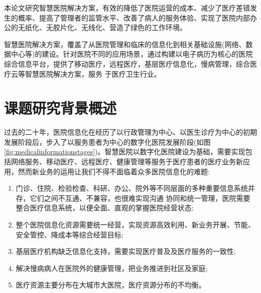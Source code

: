 \documentclass[doctor,secret]{thuthesis}
\begin{document}
本论文研究智慧医院解决方案，有效的降低了医院运营的成本、减少了医疗差错发生的概率、提高了管理者的监管水平、改善了病人的服务体验、实现了医院内部办公的无纸化、无胶片化、无线化、营造了绿色的工作环境。

智慧医院解决方案，覆盖了从医院管理和临床的信息化到相关基础设施(网络、数据中心等)的建设。针对医院不同的应用场景，通过构建以电子病历为核心的医院综合信息平台，提供了移动医疗，远程医疗，基层医疗信息化，慢病管理，综合医疗云等智慧医院解决方案，服务 于医疗卫生行业。

\section{课题研究背景概述}
\label{sec:org30526b5}
过去的二十年，医院信息化在经历了以行政管理为中心、以医生诊疗为中心的初期发展阶段后，步入了以服务患者为中心的数字化医院发展阶段(如图\ref{fig:medicalinformationstages})。智慧医院以数字化医院建设为基础，需要实现包括网络服务、移动医疗、远程医疗、健康管理等服务于医疗患者的医疗业务新应用，然而新业务的运用让我们不得不面临着众多医院信息化的难题:
\begin{enumerate}
\item 门诊、住院、检验检查、科研、办公、院外等不同层面的多种重要信息系统并存，它们之间不互通、不兼容，也很难实现沟通 协同和统一管理，医院需要整合医疗信息系统，以便全面、直观的掌握医院经营状态;
\item 整个医院信息化资源需要统一经营，实现资源高效利用、新业务开展、节能、安全管控、降成本等综合经营目标;
\item 基层医疗机构缺乏信息化支持，需要实现医疗普及及医疗服务的一致性;
\item 解决慢病病人在医院外的健康管理，把业务推进到社区及家庭;
\item 医疗资源主要分布在大城市大医院，医疗资源分布的不均衡。
\end{enumerate}
\end{document}
